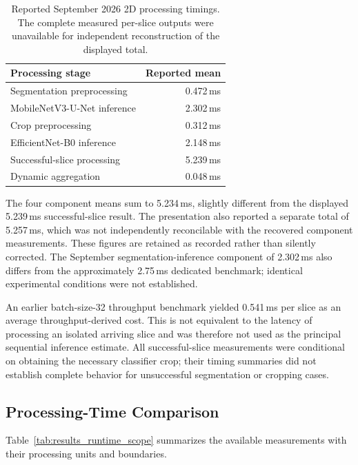 \begin{table}[htbp]
\centering
\caption{Reported September 2026 2D processing timings. The complete measured per-slice outputs were unavailable for independent reconstruction of the displayed total.}
\label{tab:results_2d_stage_latency}
\begin{tabular}{lr}
\hline
Processing stage & Reported mean \\
\hline
Segmentation preprocessing & 0.472\,ms \\
MobileNetV3-U-Net inference & 2.302\,ms \\
Crop preprocessing & 0.312\,ms \\
EfficientNet-B0 inference & 2.148\,ms \\
Successful-slice processing & 5.239\,ms \\
Dynamic aggregation & 0.048\,ms \\
\hline
\end{tabular}
\end{table}

The four component means sum to 5.234\,ms, slightly different from the displayed 5.239\,ms successful-slice result. The presentation also reported a separate total of 5.257\,ms, which was not independently reconcilable with the recovered component measurements. These figures are retained as recorded rather than silently corrected. The September segmentation-inference component of 2.302\,ms also differs from the approximately 2.75\,ms dedicated benchmark; identical experimental conditions were not established.

An earlier batch-size-32 throughput benchmark yielded 0.541\,ms per slice as an average throughput-derived cost. This is not equivalent to the latency of processing an isolated arriving slice and was therefore not used as the principal sequential inference estimate. All successful-slice measurements were conditional on obtaining the necessary classifier crop; their timing summaries did not establish complete behavior for unsuccessful segmentation or cropping cases.

\subsection{Processing-Time Comparison}
\label{subsec:results_latency_comparison}

Table~\ref{tab:results_runtime_scope} summarizes the available measurements with their processing units and boundaries.

